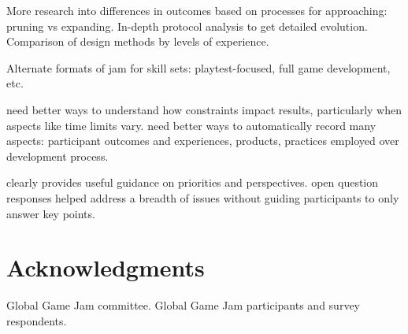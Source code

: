 \documentclass{sig-alternate}
\begin{document}
More research into differences in outcomes based on processes for approaching: pruning vs expanding. In-depth protocol analysis to get detailed evolution. Comparison of design methods by levels of experience.

Alternate formats of jam for skill sets: playtest-focused, full game development, etc.

need better ways to understand how constraints impact results, particularly when aspects like time limits vary. need better ways to automatically record many aspects: participant outcomes and experiences, products, practices employed over development process.

clearly provides useful guidance on priorities and perspectives. open question responses helped address a breadth of issues without guiding participants to only answer key points.

\section{Acknowledgments}
Global Game Jam committee. Global Game Jam participants and survey respondents.







\pagebreak

\appendix
\end{document}
